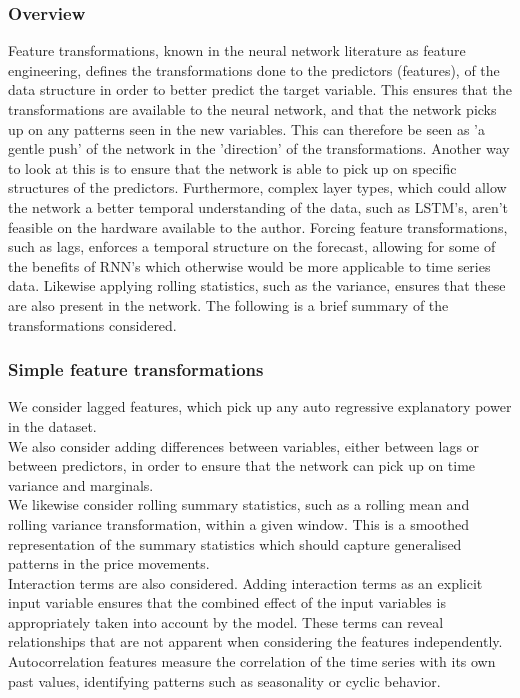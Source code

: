 \documentclass[10pt,a4paper]{article}
\numberwithin{equation}{section} %
\begin{document}
\subsubsection{Overview}
Feature transformations, known in the neural network literature as feature engineering, 
defines the transformations done to the predictors (features), of the data structure
in order to better predict the target variable.
This ensures that the transformations are available to
the neural network, and that the network picks up on any
patterns seen in the new variables.
This can therefore be seen as 'a gentle push' of the network in the 'direction' of the transformations.
Another way to look at this is to ensure that the network is able to pick up on specific structures of the predictors. 
Furthermore, complex layer types, which could allow the network a better temporal understanding of the data, such as LSTM's, aren't feasible on the hardware available
to the author. Forcing feature transformations, such as lags, enforces a temporal structure on the forecast, allowing for some of the benefits of RNN's which otherwise would be more applicable to time series data.
Likewise applying rolling statistics, such as the variance, ensures that these are also present in the network.
The following is a brief summary of the transformations considered.
\subsubsection{Simple feature transformations}
We consider lagged features, which pick up any auto regressive explanatory power in the dataset.\\
We also consider adding differences between variables, either between lags or between predictors, in order to ensure that the network can pick up on time variance and marginals.\\ 
We likewise consider rolling summary statistics, such as a rolling mean and rolling variance transformation, within a given window. This is a smoothed representation of the summary statistics which should capture generalised patterns in the price movements.\\
Interaction terms are also considered. Adding interaction terms as an explicit input variable ensures that the combined effect of the input variables is appropriately taken into account by the model. These terms can reveal relationships that are not apparent when considering the features independently.\\
Autocorrelation features measure the correlation of the time series with its own past values, identifying patterns such as seasonality or cyclic behavior.
\end{document}
